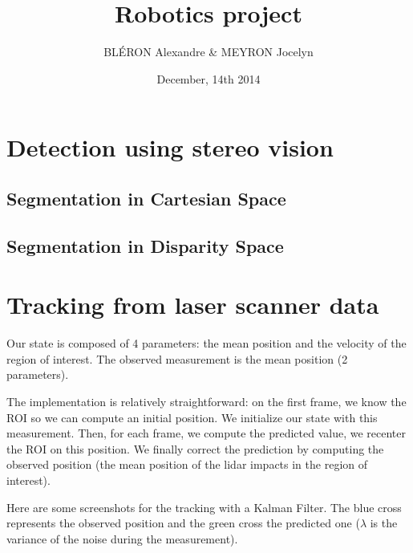 \documentclass[a4paper,11pt]{article}
\title{Robotics project}
\author{BLÉRON Alexandre \& MEYRON Jocelyn}
\date{December, 14th 2014}
\begin{document}
\maketitle

\section{Detection using stereo vision}
\subsection{Segmentation in Cartesian Space}

\subsection{Segmentation in Disparity Space}

\newpage
\section{Tracking from laser scanner data}
Our state is composed of 4 parameters: the mean position and the velocity of
the region of interest. The observed measurement is the mean position (2
parameters).

The implementation is relatively straightforward: on the first frame, we know
the ROI so we can compute an initial position. We initialize our state with this
measurement. Then, for each frame, we compute the predicted value, we recenter
the ROI on this position. We finally correct the prediction by computing the
observed position (the mean position of the lidar impacts in the region of
interest).

Here are some screenshots for the tracking with a Kalman Filter. The blue cross
represents the observed position and the green cross the predicted one ($
\lambda $ is the variance of the noise during the measurement).
\end{document}
